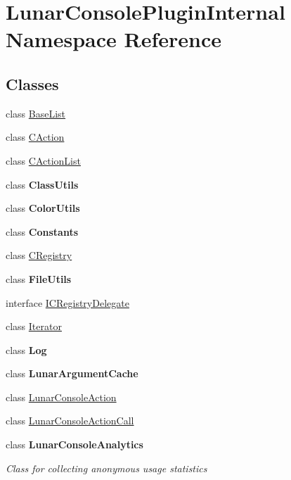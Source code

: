 \hypertarget{namespace_lunar_console_plugin_internal}{}\section{Lunar\+Console\+Plugin\+Internal Namespace Reference}
\label{namespace_lunar_console_plugin_internal}
\subsection*{Classes}
\begin{DoxyCompactItemize}
\item 
class \mbox{\hyperlink{class_lunar_console_plugin_internal_1_1_base_list}{Base\+List}}
\item 
class \mbox{\hyperlink{class_lunar_console_plugin_internal_1_1_c_action}{C\+Action}}
\item 
class \mbox{\hyperlink{class_lunar_console_plugin_internal_1_1_c_action_list}{C\+Action\+List}}
\item 
class {\bfseries Class\+Utils}
\item 
class {\bfseries Color\+Utils}
\item 
class {\bfseries Constants}
\item 
class \mbox{\hyperlink{class_lunar_console_plugin_internal_1_1_c_registry}{C\+Registry}}
\item 
class {\bfseries File\+Utils}
\item 
interface \mbox{\hyperlink{interface_lunar_console_plugin_internal_1_1_i_c_registry_delegate}{I\+C\+Registry\+Delegate}}
\item 
class \mbox{\hyperlink{class_lunar_console_plugin_internal_1_1_iterator}{Iterator}}
\item 
class {\bfseries Log}
\item 
class {\bfseries Lunar\+Argument\+Cache}
\item 
class \mbox{\hyperlink{class_lunar_console_plugin_internal_1_1_lunar_console_action}{Lunar\+Console\+Action}}
\item 
class \mbox{\hyperlink{class_lunar_console_plugin_internal_1_1_lunar_console_action_call}{Lunar\+Console\+Action\+Call}}
\item 
class {\bfseries Lunar\+Console\+Analytics}
\begin{DoxyCompactList}\small\item\em Class for collecting anonymous usage statistics \end{DoxyCompactList}\item 

\end{DoxyCompactItemize}

